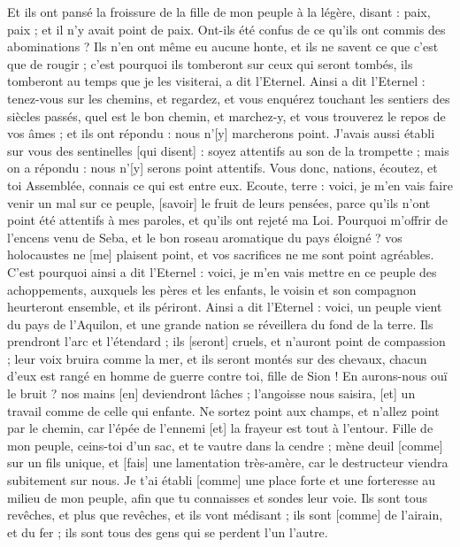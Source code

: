 \begin{multicols}{2}
Et ils ont pansé la froissure de la fille de mon peuple à la légère, disant : paix, paix ; et il n'y avait point de paix.
Ont-ils été confus de ce qu'ils ont commis des abominations ? Ils n'en ont même eu aucune honte, et ils ne savent ce que c'est que de rougir ; c'est pourquoi ils tomberont sur ceux qui seront tombés, ils tomberont au temps que je les visiterai, a dit l'Eternel.
Ainsi a dit l'Eternel : tenez-vous sur les chemins, et regardez, et vous enquérez touchant les sentiers des siècles passés, quel est le bon chemin, et marchez-y, et vous trouverez le repos de vos âmes ; et ils ont répondu : nous n'[y] marcherons point.
J'avais aussi établi sur vous des sentinelles [qui disent] : soyez attentifs au son de la trompette ; mais on a répondu : nous n'[y] serons point attentifs.
Vous donc, nations, écoutez, et toi Assemblée, connais ce qui est entre eux.
Ecoute, terre : voici, je m'en vais faire venir un mal sur ce peuple, [savoir] le fruit de leurs pensées, parce qu'ils n'ont point été attentifs à mes paroles, et qu'ils ont rejeté ma Loi.
Pourquoi m'offrir de l'encens venu de Seba, et le bon roseau aromatique du pays éloigné ? vos holocaustes ne [me] plaisent point, et vos sacrifices ne me sont point agréables.
C'est pourquoi ainsi a dit l'Eternel : voici, je m'en vais mettre en ce peuple des achoppements, auxquels les pères et les enfants, le voisin et son compagnon heurteront ensemble, et ils périront.
Ainsi a dit l'Eternel : voici, un peuple vient du pays de l'Aquilon, et une grande nation se réveillera du fond de la terre.
Ils prendront l'arc et l'étendard ; ils [seront] cruels, et n'auront point de compassion ; leur voix bruira comme la mer, et ils seront montés sur des chevaux, chacun d'eux est rangé en homme de guerre contre toi, fille de Sion !
En aurons-nous ouï le bruit ? nos mains [en] deviendront lâches ; l'angoisse nous saisira, [et] un travail comme de celle qui enfante.
Ne sortez point aux champs, et n'allez point par le chemin, car l'épée de l'ennemi [et] la frayeur est tout à l'entour.
Fille de mon peuple, ceins-toi d'un sac, et te vautre dans la cendre ; mène deuil [comme] sur un fils unique, et [fais] une lamentation très-amère, car le destructeur viendra subitement sur nous.
Je t'ai établi [comme] une place forte et une forteresse au milieu de mon peuple, afin que tu connaisses et sondes leur voie.
Ils sont tous revêches, et plus que revêches, et ils vont médisant ; ils sont [comme] de l'airain, et du fer ; ils sont tous des gens qui se perdent l'un l'autre.

\end{multicols}
